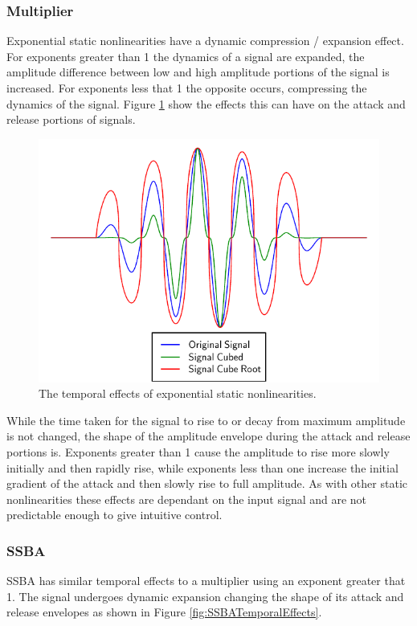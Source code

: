 		\subsubsection*{Multiplier}
			Exponential static nonlinearities have a dynamic compression / expansion effect. For exponents
			greater than 1 the dynamics of a signal are expanded, the amplitude difference between low and high
			amplitude portions of the signal is increased. For exponents less that 1 the opposite occurs,
			compressing the dynamics of the signal. Figure \ref{fig:ExponentiationTemporalEffects} show the
			effects this can have on the attack and release portions of signals.

			\begin{figure}[h!]
				\centering
				\includegraphics{chapter5/Images/ExponentiationTemporalEffects.pdf}
				\caption{The temporal effects of exponential static nonlinearities.}
				\label{fig:ExponentiationTemporalEffects}
			\end{figure}

			While the time taken for the signal to rise to or decay from maximum amplitude is not changed, the
			shape of the amplitude envelope during the attack and release portions is. Exponents greater than 1
			cause the amplitude to rise more slowly initially and then rapidly rise, while exponents less than
			one increase the initial gradient of the attack and then slowly rise to full amplitude. As with
			other static nonlinearities these effects are dependant on the input signal and are not predictable
			enough to give intuitive control.

		\subsubsection*{SSBA}
			SSBA has similar temporal effects to a multiplier using an exponent greater that 1. The signal
			undergoes dynamic expansion changing the shape of its attack and release envelopes as shown in
			Figure \ref{fig:SSBATemporalEffects}.

